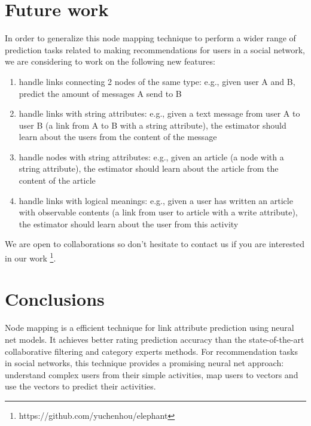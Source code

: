 \documentclass{article}
\begin{document}
\section{Future work}
In order to generalize this node mapping technique to perform a wider range of 
prediction tasks related to making recommendations for users in a social 
network, we are considering to work on the following new features:
\begin{enumerate}
	\item handle links connecting 2 nodes of the same type: e.g., given user A 
	and B, predict the amount of messages A send to B
	\item handle links with string attributes: e.g., given a text message from 
	user A to user B (a link from A to B with a string attribute), the 
	estimator should learn about the users from the content of the message
	\item handle nodes with string attributes: e.g., given an article (a node 
	with a string attribute), the estimator should learn about the article from 
	the content of the article
	\item handle links with logical meanings: e.g., given a user has written an 
	article with observable contents (a link from user to article with a write 
	attribute), the estimator should learn about the user from this activity
\end{enumerate}
We are open to collaborations so don't hesitate to contact us if you are 
interested in our work \footnote{https://github.com/yuchenhou/elephant}.

\section{Conclusions}
Node mapping is a efficient technique for link attribute prediction using 
neural net models.
It achieves better rating prediction accuracy than the state-of-the-art 
collaborative filtering and category experts methods.
For recommendation tasks in social networks, this technique provides a 
promising neural net approach:
understand complex users from their simple activities, map users to 
vectors and use the vectors to predict their activities.



\end{document}
